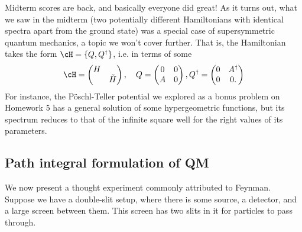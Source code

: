 Midterm scores are back, and basically everyone did great! As it turns out, what we saw in the midterm (two potentially different Hamiltonians with identical spectra apart from the ground state) was a special case of supersymmetric quantum mechanics, a topic we won't cover further. That is, the Hamiltonian takes the form $\cH = \set{Q,Q^\dagger}$, i.e. in terms of some
\begin{equation}
    \cH = \begin{pmatrix}
        H &\\
        & \tilde H
    \end{pmatrix},
    \quad Q = \begin{pmatrix}
    0 & 0\\
    A & 0
    \end{pmatrix},
    Q^\dagger = \begin{pmatrix}
    0 & A^\dagger \\
    0 & 0.
    \end{pmatrix}
\end{equation}
For instance, the P\"oschl-Teller potential we explored as a bonus problem on Homework 5 has a general solution of some hypergeometric functions, but its spectrum reduces to that of the infinite square well for the right values of its parameters.

\subsection*{Path integral formulation of QM}
We now present a thought experiment commonly attributed to Feynman. Suppose we have a double-slit setup, where there is some source, a detector, and a large screen between them. This screen has two slits in it for particles to pass through.

